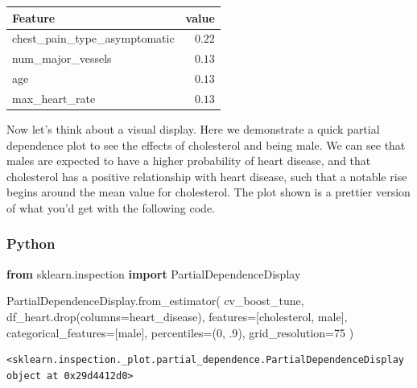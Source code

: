 \documentclass[
  letterpaper,
]{krantz}
\newenvironment{Shaded}{}{}
\newcommand{\DecValTok}[1]{\textcolor[rgb]{0.25,0.63,0.44}{#1}}
\newcommand{\FloatTok}[1]{\textcolor[rgb]{0.25,0.63,0.44}{#1}}
\newcommand{\ImportTok}[1]{\textcolor[rgb]{0.00,0.50,0.00}{\textbf{#1}}}
\newcommand{\NormalTok}[1]{#1}
\newcommand{\OperatorTok}[1]{\textcolor[rgb]{0.40,0.40,0.40}{#1}}
\newcommand{\StringTok}[1]{\textcolor[rgb]{0.25,0.44,0.63}{#1}}
\begin{document}
\begin{longtable*}{lr}
\toprule
Feature & value \\ 
\midrule
chest\_pain\_type\_asymptomatic & $0.22$ \\ 
num\_major\_vessels & $0.13$ \\ 
age & $0.13$ \\ 
max\_heart\_rate & $0.13$ \\ 
\bottomrule
\end{longtable*}

Now let's think about a visual display. Here we demonstrate a quick
partial dependence plot to see the effects of cholesterol and being
male. We can see that males are expected to have a higher probability of
heart disease, and that cholesterol has a positive relationship with
heart disease, such that a notable rise begins around the mean value for
cholesterol. The plot shown is a prettier version of what you'd get with
the following code.

\subsubsection{Python}

\begin{Shaded}
\begin{Highlighting}[]
\ImportTok{from}\NormalTok{ sklearn.inspection }\ImportTok{import}\NormalTok{ PartialDependenceDisplay}

\NormalTok{PartialDependenceDisplay.from\_estimator(}
\NormalTok{    cv\_boost\_tune, }
\NormalTok{    df\_heart.drop(columns}\OperatorTok{=}\StringTok{\textquotesingle{}heart\_disease\textquotesingle{}}\NormalTok{), }
\NormalTok{    features}\OperatorTok{=}\NormalTok{[}\StringTok{\textquotesingle{}cholesterol\textquotesingle{}}\NormalTok{, }\StringTok{\textquotesingle{}male\textquotesingle{}}\NormalTok{], }
\NormalTok{    categorical\_features}\OperatorTok{=}\NormalTok{[}\StringTok{\textquotesingle{}male\textquotesingle{}}\NormalTok{], }
\NormalTok{    percentiles}\OperatorTok{=}\NormalTok{(}\DecValTok{0}\NormalTok{, }\FloatTok{.9}\NormalTok{),}
\NormalTok{    grid\_resolution}\OperatorTok{=}\DecValTok{75}
\NormalTok{)}
\end{Highlighting}
\end{Shaded}

\begin{verbatim}
<sklearn.inspection._plot.partial_dependence.PartialDependenceDisplay object at 0x29d4412d0>
\end{verbatim}
\end{document}

